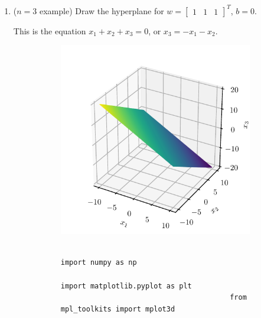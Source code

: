 \documentclass{article}
\newenvironment{solution}{\begin{adjustwidth}{8mm}{}}{\end{adjustwidth}}
\begin{document}
\begin{enumerate}
\begin{solution}
\begin{figure}[h]
\begin{subfigure}{0.40\linewidth}
\begin{verbatim}
                                        plt.plot(x1,x2)
                                        plt.xlabel('$x_1$')
                                        plt.ylabel('$x_2$')
                                \end{verbatim}
                        \end{subfigure}
                \end{figure}
        \end{solution}
        \item ($n = 3$ example)
                Draw the hyperplane for $w = \begin{bmatrix} 1 & 1 & 1 \end{bmatrix}^T$, $b=0$.
        \begin{solution}
                This is the equation $x_1 + x_2 + x_3 = 0$, or $x_3 = -x_1 - x_2$.
                \begin{figure}[h]
                        \begin{subfigure}{0.5\linewidth}
                                \centering
                                \includegraphics[width=\linewidth]{A9b.pdf}
                        \end{subfigure}
                        \hfill
                        \begin{subfigure}{0.40\linewidth}
                                \centering
                                \begin{verbatim}
                                        import numpy as np
                                        import matplotlib.pyplot as plt
                                        from mpl_toolkits import mplot3d


\end{verbatim}
\end{subfigure}
\end{figure}
\end{solution}
\end{enumerate}
\end{document}
